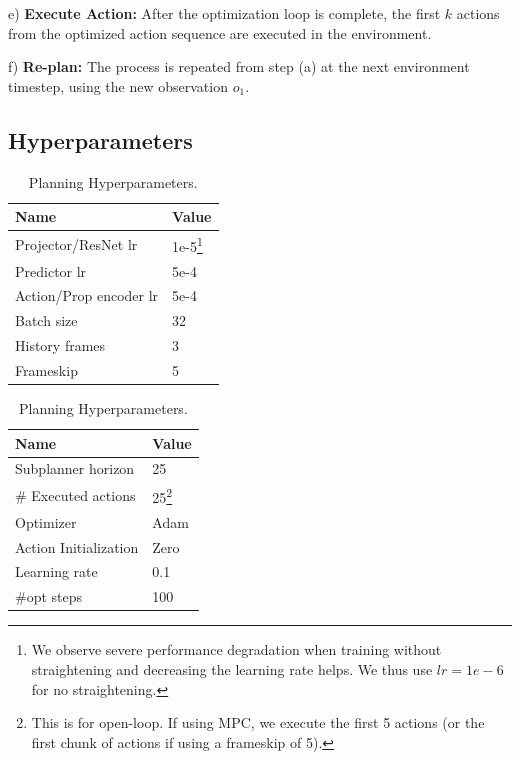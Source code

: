 e) \textbf{Execute Action:} After the optimization loop is complete, the first $k$ actions from the optimized action sequence are executed in the environment.

f) \textbf{Re-plan:} The process is repeated from step (a) at the next environment timestep, using the new observation $o_1$.

\clearpage

\subsection{Hyperparameters}

\begin{table}[h]
\centering
\begin{minipage}[t]{0.45\textwidth}
\centering
\caption{Training Hyperparameters. }
\label{tab:train_hyperparams}
\begin{tabular}{ll}
\hline
\textbf{Name} & \textbf{Value} \\ 
\hline
Projector/ResNet lr & 1e-5\footnote{We observe severe performance degradation when training without straightening and decreasing the learning rate helps. We thus use $lr=1e-6$ for no straightening.} \\
Predictor lr & 5e-4 \\
Action/Prop encoder lr & 5e-4 \\
Batch size & 32 \\ 
History frames & 3 \\
Frameskip & 5 \\
\hline
\end{tabular}
\end{minipage}
\hfill
\begin{minipage}[t]{0.45\textwidth}
\centering
\caption{Planning Hyperparameters.}
\label{tab:plan_hyperparams}
\begin{tabular}{ll}
\hline
\textbf{Name} & \textbf{Value} \\ 
\hline
Subplanner horizon & 25 \\
\# Executed actions & 25\footnote{This is for open-loop. If using MPC, we execute the first 5 actions (or the first chunk of actions if using a frameskip of 5). } \\
Optimizer & Adam \\
Action Initialization & Zero \\
Learning rate & 0.1 \\
\#opt steps & 100 \\
\hline
\end{tabular}
\end{minipage}
\end{table}

